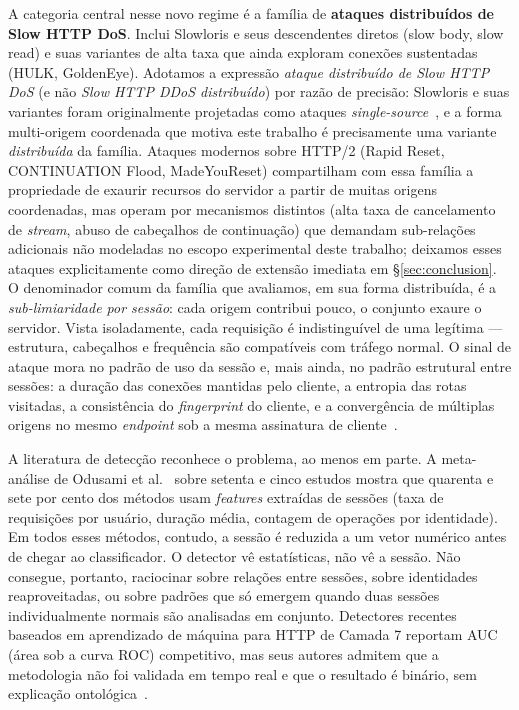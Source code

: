 \documentclass[preprint,12pt]{elsarticle}
\begin{document}
A categoria central nesse novo regime é a família de \textbf{ataques distribuídos de Slow HTTP DoS}. Inclui Slowloris e seus descendentes diretos (slow body, slow read) e suas variantes de alta taxa que ainda exploram conexões sustentadas (HULK, GoldenEye). Adotamos a expressão \emph{ataque distribuído de Slow HTTP DoS} (e não \emph{Slow HTTP DDoS distribuído}) por razão de precisão: Slowloris e suas variantes foram originalmente projetadas como ataques \emph{single-source}~\cite{cambiaso2013slowdos}, e a forma multi-origem coordenada que motiva este trabalho é precisamente uma variante \emph{distribuída} da família. Ataques modernos sobre HTTP/2 (Rapid Reset, CONTINUATION Flood, MadeYouReset) compartilham com essa família a propriedade de exaurir recursos do servidor a partir de muitas origens coordenadas, mas operam por mecanismos distintos (alta taxa de cancelamento de \emph{stream}, abuso de cabeçalhos de continuação) que demandam sub-relações adicionais não modeladas no escopo experimental deste trabalho; deixamos esses ataques explicitamente como direção de extensão imediata em §\ref{sec:conclusion}. O denominador comum da família que avaliamos, em sua forma distribuída, é a \emph{sub-limiaridade por sessão}: cada origem contribui pouco, o conjunto exaure o servidor. Vista isoladamente, cada requisição é indistinguível de uma legítima --- estrutura, cabeçalhos e frequência são compatíveis com tráfego normal. O sinal de ataque mora no padrão de uso da sessão e, mais ainda, no padrão estrutural entre sessões: a duração das conexões mantidas pelo cliente, a entropia das rotas visitadas, a consistência do \emph{fingerprint} do cliente, e a convergência de múltiplas origens no mesmo \emph{endpoint} sob a mesma assinatura de cliente~\cite{kemp2023approach,bharathi2012pca,fernandes2015autonomous}.

A literatura de detecção reconhece o problema, ao menos em parte. A meta-análise de Odusami et al.~\cite{odusami2020survey} sobre setenta e cinco estudos mostra que quarenta e sete por cento dos métodos usam \emph{features} extraídas de sessões (taxa de requisições por usuário, duração média, contagem de operações por identidade). Em todos esses métodos, contudo, a sessão é reduzida a um vetor numérico antes de chegar ao classificador. O detector vê estatísticas, não vê a sessão. Não consegue, portanto, raciocinar sobre relações entre sessões, sobre identidades reaproveitadas, ou sobre padrões que só emergem quando duas sessões individualmente normais são analisadas em conjunto. Detectores recentes baseados em aprendizado de máquina para HTTP de Camada 7 reportam AUC (área sob a curva ROC) competitivo, mas seus autores admitem que a metodologia não foi validada em tempo real e que o resultado é binário, sem explicação ontológica~\cite{kemp2023approach}.
\end{document}
